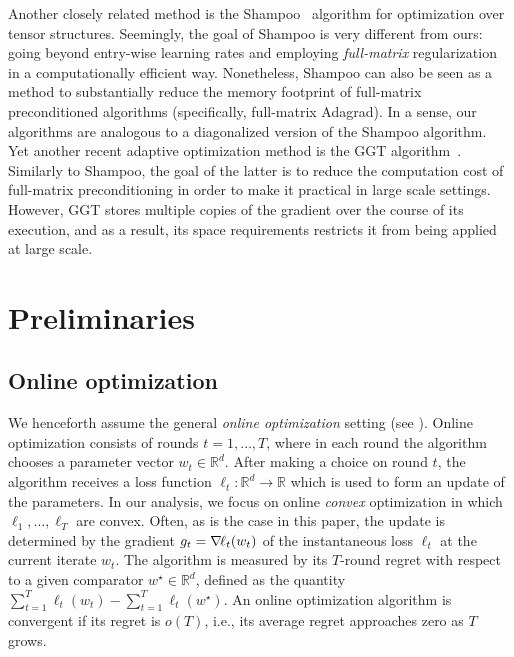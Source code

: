 \documentclass[a4paper,11pt]{article}
\newcommand{\reals}{\mathbb{R}}
\let\nablaold\nabla
\renewcommand{\nabla}{\nablaold\mkern-1mu}
\begin{document}
Another closely related method is the Shampoo~\cite{shampoo-icml} algorithm for
optimization over tensor structures. Seemingly, the goal of Shampoo is very
different from ours: going beyond entry-wise learning rates and employing
\emph{full-matrix} regularization in a computationally efficient way.
Nonetheless, Shampoo can also be seen as a method to substantially reduce the
memory footprint of full-matrix preconditioned algorithms (specifically,
full-matrix Adagrad). In a sense, our algorithms are analogous to a diagonalized
version of the Shampoo algorithm.
Yet another recent adaptive optimization method is the GGT
algorithm~\citep{GGT}. Similarly to Shampoo, the goal of the latter is to reduce
the computation cost of full-matrix preconditioning in order to make it
practical in large scale settings. However, GGT stores multiple copies of the
gradient over the course of its execution, and as a result, its space
requirements restricts it from being applied at large scale.



\section{Preliminaries}
\label{sec:prelim}



\subsection{Online optimization}
We henceforth assume the general {\em online optimization} setting (see
\citep{shalev2012online,hazan2016introduction}). Online optimization consists of
rounds $t=1,\ldots,T$, where in each round the algorithm chooses a parameter
vector $w_t \in \reals^d$. After making a choice on round $t$, the algorithm
receives a loss function $\ell_t : \reals^d \to \reals$ which is used to form an
update of the parameters. In our analysis, we focus on online {\em convex}
optimization in which $\ell_1,\ldots,\ell_T$ are convex. Often, as is the case
in this paper, the update is determined by the gradient $g_t=\nabla\ell_t(w_t)$
of the instantaneous loss $\ell_t$ at the current iterate $w_t$. The algorithm
is measured by its $T$-round regret with respect to a given comparator $w^\star
\in \reals^d$, defined as the quantity
$
  \sum_{t=1}^T \ell_t(w_t) - \sum_{t=1}^T \ell_t(w^\star)
  .
$
An online optimization algorithm is convergent if its regret is $o(T)$, i.e.,
its average regret approaches zero as $T$ grows.
\end{document}
